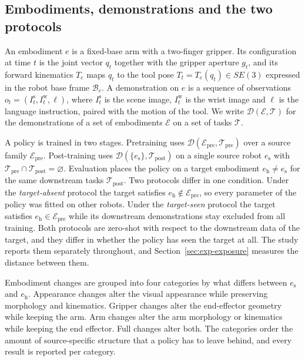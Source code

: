 \subsection{Embodiments, demonstrations and the two protocols}
\label{sec:setting}

An embodiment $e$ is a fixed-base arm with a two-finger gripper. Its configuration at time $t$ is the joint vector $q_t$ together with the gripper aperture $g_t$, and its forward kinematics $T_e$ maps $q_t$ to the tool pose $T_t = T_e(q_t) \in SE(3)$ expressed in the robot base frame $\mathcal{B}_e$. A demonstration on $e$ is a sequence of observations $o_t = (I^{\mathrm{s}}_t, I^{\mathrm{w}}_t, \ell)$, where $I^{\mathrm{s}}_t$ is the scene image, $I^{\mathrm{w}}_t$ is the wrist image and $\ell$ is the language instruction, paired with the motion of the tool. We write $\mathcal{D}(\mathcal{E}, \mathcal{T})$ for the demonstrations of a set of embodiments $\mathcal{E}$ on a set of tasks $\mathcal{T}$.

A policy is trained in two stages. Pretraining uses $\mathcal{D}(\mathcal{E}_{\mathrm{pre}}, \mathcal{T}_{\mathrm{pre}})$ over a source family $\mathcal{E}_{\mathrm{pre}}$. Post-training uses $\mathcal{D}(\{e_{\mathrm{s}}\}, \mathcal{T}_{\mathrm{post}})$ on a single source robot $e_{\mathrm{s}}$ with $\mathcal{T}_{\mathrm{pre}} \cap \mathcal{T}_{\mathrm{post}} = \varnothing$. Evaluation places the policy on a target embodiment $e_{\mathrm{h}} \neq e_{\mathrm{s}}$ for the same downstream tasks $\mathcal{T}_{\mathrm{post}}$. Two protocols differ in one condition. Under the \emph{target-absent} protocol the target satisfies $e_{\mathrm{h}} \notin \mathcal{E}_{\mathrm{pre}}$, so every parameter of the policy was fitted on other robots. Under the \emph{target-seen} protocol the target satisfies $e_{\mathrm{h}} \in \mathcal{E}_{\mathrm{pre}}$ while its downstream demonstrations stay excluded from all training. Both protocols are zero-shot with respect to the downstream data of the target, and they differ in whether the policy has seen the target at all. The study reports them separately throughout, and Section~\ref{sec:exp-exposure} measures the distance between them.

Embodiment changes are grouped into four categories by what differs between $e_{\mathrm{s}}$ and $e_{\mathrm{h}}$. Appearance changes alter the visual appearance while preserving morphology and kinematics. Gripper changes alter the end-effector geometry while keeping the arm. Arm changes alter the arm morphology or kinematics while keeping the end effector. Full changes alter both. The categories order the amount of source-specific structure that a policy has to leave behind, and every result is reported per category.

